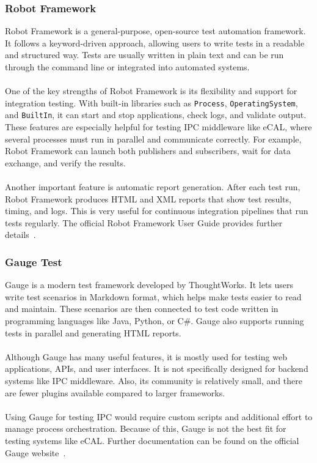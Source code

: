 \subsubsection*{Robot Framework}

Robot Framework is a general-purpose, open-source test automation framework. It follows a keyword-driven approach, allowing users to write tests in a readable and structured way. Tests are usually written in plain text and can be run through the command line or integrated into automated systems.
\\
\\
One of the key strengths of Robot Framework is its flexibility and support for integration testing. With built-in libraries such as \texttt{Process}, \texttt{OperatingSystem}, and \texttt{BuiltIn}, it can start and stop applications, check logs, and validate output. These features are especially helpful for testing IPC middleware like eCAL, where several processes must run in parallel and communicate correctly. For example, Robot Framework can launch both publishers and subscribers, wait for data exchange, and verify the results.
\\
\\
Another important feature is automatic report generation. After each test run, Robot Framework produces HTML and XML reports that show test results, timing, and logs. This is very useful for continuous integration pipelines that run tests regularly. The official Robot Framework User Guide provides further details~\cite{RobotFrameworkDocs}.

\subsubsection*{Gauge Test}

Gauge is a modern test framework developed by ThoughtWorks. It lets users write test scenarios in Markdown format, which helps make tests easier to read and maintain. These scenarios are then connected to test code written in programming languages like Java, Python, or C\#. Gauge also supports running tests in parallel and generating HTML reports.
\\
\\
Although Gauge has many useful features, it is mostly used for testing web applications, APIs, and user interfaces. It is not specifically designed for backend systems like IPC middleware. Also, its community is relatively small, and there are fewer plugins available compared to larger frameworks.
\\
\\
Using Gauge for testing IPC would require custom scripts and additional effort to manage process orchestration. Because of this, Gauge is not the best fit for testing systems like eCAL. Further documentation can be found on the official Gauge website~\cite{GaugeDocs}.

